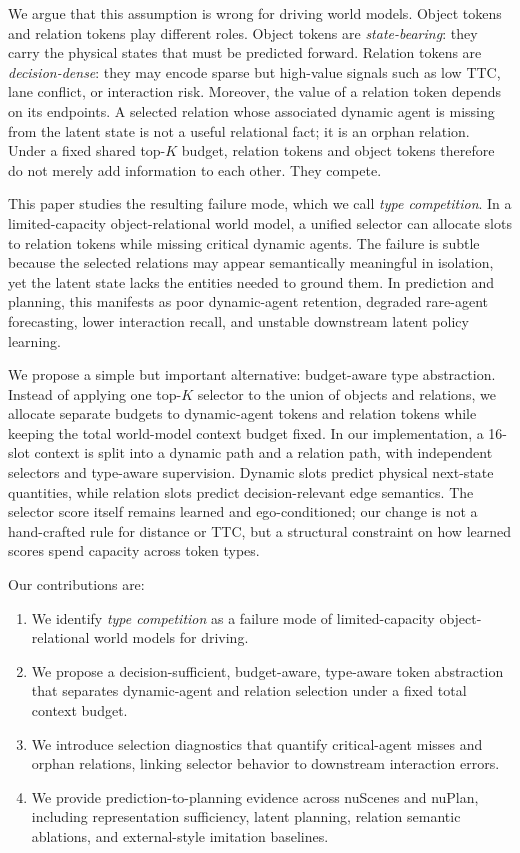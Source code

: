 \documentclass[10pt]{article}
\begin{document}
We argue that this assumption is wrong for driving world models. Object tokens and relation tokens play different roles. Object tokens are \emph{state-bearing}: they carry the physical states that must be predicted forward. Relation tokens are \emph{decision-dense}: they may encode sparse but high-value signals such as low TTC, lane conflict, or interaction risk. Moreover, the value of a relation token depends on its endpoints. A selected relation whose associated dynamic agent is missing from the latent state is not a useful relational fact; it is an orphan relation. Under a fixed shared top-$K$ budget, relation tokens and object tokens therefore do not merely add information to each other. They compete.

This paper studies the resulting failure mode, which we call \emph{type competition}. In a limited-capacity object-relational world model, a unified selector can allocate slots to relation tokens while missing critical dynamic agents. The failure is subtle because the selected relations may appear semantically meaningful in isolation, yet the latent state lacks the entities needed to ground them. In prediction and planning, this manifests as poor dynamic-agent retention, degraded rare-agent forecasting, lower interaction recall, and unstable downstream latent policy learning.

We propose a simple but important alternative: budget-aware type abstraction. Instead of applying one top-$K$ selector to the union of objects and relations, we allocate separate budgets to dynamic-agent tokens and relation tokens while keeping the total world-model context budget fixed. In our implementation, a 16-slot context is split into a dynamic path and a relation path, with independent selectors and type-aware supervision. Dynamic slots predict physical next-state quantities, while relation slots predict decision-relevant edge semantics. The selector score itself remains learned and ego-conditioned; our change is not a hand-crafted rule for distance or TTC, but a structural constraint on how learned scores spend capacity across token types.

Our contributions are:
\begin{enumerate}
    \item We identify \emph{type competition} as a failure mode of limited-capacity object-relational world models for driving.
    \item We propose a decision-sufficient, budget-aware, type-aware token abstraction that separates dynamic-agent and relation selection under a fixed total context budget.
    \item We introduce selection diagnostics that quantify critical-agent misses and orphan relations, linking selector behavior to downstream interaction errors.
    \item We provide prediction-to-planning evidence across nuScenes and nuPlan, including representation sufficiency, latent planning, relation semantic ablations, and external-style imitation baselines.
\end{enumerate}
\end{document}
